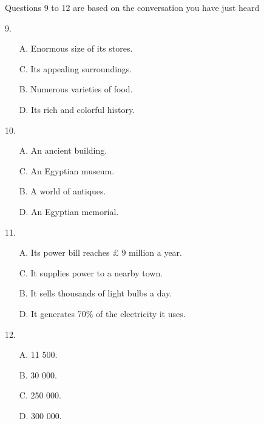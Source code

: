 \documentclass[UTF8,11pt]{ctexart}
\begin{document}
Questions 9 to 12 are based on the conversation you have just heard


9.


\begin{itemize}[leftmargin=2em,itemsep=.2em,topsep=.4em]\item[A.] Enormous size of its stores.
\item[C.] Its appealing surroundings.
\end{itemize}

\begin{itemize}[leftmargin=2em,itemsep=.2em,topsep=.4em]\item[B.] Numerous varieties of food.
\item[D.] Its rich and colorful history.
\end{itemize}

10.


\begin{itemize}[leftmargin=2em,itemsep=.2em,topsep=.4em]\item[A.] An ancient building.
\item[C.] An Egyptian museum.
\end{itemize}

\begin{itemize}[leftmargin=2em,itemsep=.2em,topsep=.4em]\item[B.] A world of antiques.
\item[D.] An Egyptian memorial.
\end{itemize}

11.


\begin{itemize}[leftmargin=2em,itemsep=.2em,topsep=.4em]\item[A.] Its power bill reaches £ 9 million a year.
\item[C.] It supplies power to a nearby town.
\end{itemize}

\begin{itemize}[leftmargin=2em,itemsep=.2em,topsep=.4em]\item[B.] It sells thousands of light bulbs a day.
\item[D.] It generates 70\% of the electricity it uses.
\end{itemize}

12.


\begin{itemize}[leftmargin=2em,itemsep=.2em,topsep=.4em]\item[A.] 11 500.
\item[B.] 30 000.
\item[C.] 250 000.
\item[D.] 300 000.
\end{itemize}
\end{document}
